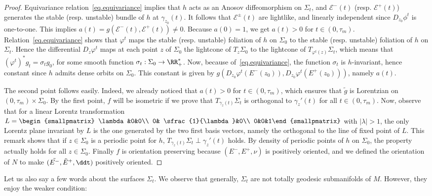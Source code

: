 \begin{proof}
Equivariance relation~\eqref{eq.equivariance} implies that $h$ acts as an Anosov diffeomorphism on $\Sigma_t$, and $\mathcal{E}^{-}(t)$ (resp. $\mathcal{E}^{+}(t)$) generates the stable (resp. unstable) bundle of $h$ at $\gamma_{z_0}(t)$. It follows that $\mathcal{E}^{\pm}(t)$ are lightlike, and linearly independent since $D_{z_0}\phi^t$ is one-to-one. This implies $a(t)=g(\mathcal{E}^{-}(t),\mathcal{E}^{+}(t))\not = 0$. Because $a(0)=1$, we get $a(t)>0$ for $t \in (0,\tau_m)$. Relation~\eqref{eq.equivariance} shows that $\varphi^t$ maps the stable (resp. unstable) foliation of $h$ on ${\Sigma}_0$ to the stable (resp. unstable) foliation of $h$ on ${\Sigma}_t$. Hence the differential $D_z\varphi^t$ maps at each point $z$ of ${\Sigma}_0$ the lightcone of ${T}_z{\Sigma}_0$ to the lightcone of ${T}_{\varphi^t(z)}{\Sigma}_t$, which means that $(\varphi^t)^*g_t=\sigma_tg_0$, for some smooth function $\sigma_t : {\Sigma}_0 \to \RR_+^*$. Now, because of~\eqref{eq.equivariance}, the function $\sigma_t$ is $h$-invariant, hence constant since $h$ admits dense orbits on ${\Sigma}_0$. This constant is given by $g(D_{z_0}\varphi^t(E^-(z_0)), D_{z_0}\varphi^t(E^+(z_0)))$, namely ${a}(t)$.


The second point follows easily. Indeed, we already noticed that $a(t)>0$ for $t \in (0,\tau_m)$, which ensures that $\tilde{g}$ is Lorentzian on $(0,\tau_m) \times \Sigma_0$. By the first point, $f$ will be isometric if we prove that $T_{\gamma_z(t)}\Sigma_t$ is orthogonal to $\gamma_z'(t)$ for all $t \in (0,\tau_m)$. Now, observe that for a linear Lorentz transformation $L=\begin{smallpmatrix} \lambda&0&0\\ 0& \sfrac{1}{\lambda}&0\\ 0&0&1\end{smallpmatrix}$ with $|\lambda|>1$, the only Lorentz plane invariant by $L$ is the one generated by the two first basis vectors, namely the orthogonal to the line of fixed point of $L$. This remark shows that if $z \in \Sigma_0$ is a periodic point for $h$, $T_{\gamma_z(t)}\Sigma_t \perp \gamma_z'(t)$ holds. By density of periodic points of $h$ on ${\Sigma}_0$, the property actually holds for all $z \in {\Sigma}_0$. Finally $f$ is orientation preserving because $(E^-,E^+,\nu)$ is positively oriented, and we defined the orientation of $N$ to make $(\tilde{E^-},\tilde{E}^+,\ddt)$ positively oriented.
\end{proof}

Let us also say a few words about the surfaces $\Sigma_t$. We observe that generally, $\Sigma_t$ are not totally geodesic submanifolds of $M$. However, they enjoy the weaker condition:

